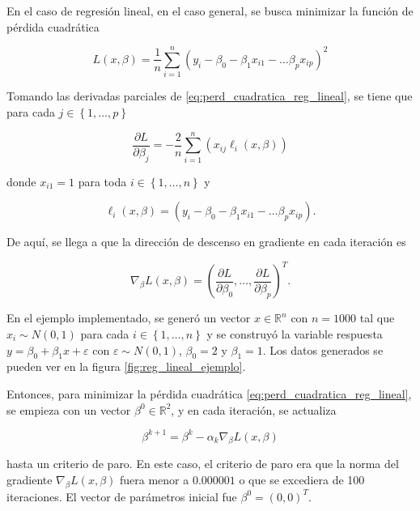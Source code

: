 En el caso de regresión lineal, en el caso general, se busca minimizar la función de pérdida cuadrática

\begin{equation}
  \label{eq:perd_cuadratica_reg_lineal}
  L(x, \beta) = \frac{1}{n} \sum_{i = 1}^n \left( y_i - \beta_0 - \beta_1 x_{i1} - \hdots  \beta_p x_{ip} \right)^2
\end{equation}

Tomando las derivadas parciales de \ref{eq:perd_cuadratica_reg_lineal}, se tiene que para cada $j \in \left\{1, \hdots, p \right\}$

\begin{equation}
  \frac{\partial L}{\partial \beta_j} = 
    -\frac{2}{n} \sum_{i = 1}^n \left( x_{ij} \ell_i(x, \beta) \right)
\end{equation}

donde $x_{i1} = 1$ para toda $i \in \left\{1, \hdots, n \right\}$ y

\begin{equation}
  \label{eq:ele_i_reg_lineal}
  \ell_i(x, \beta) = \left( y_i - \beta_0 - \beta_1 x_{i1} - \hdots  \beta_p x_{ip} \right).
\end{equation}

De aquí, se llega a que la dirección de descenso en gradiente en cada iteración es

$$
  \nabla_{\beta} L(x, \beta) = \left( \frac{\partial L}{\partial \beta_0}, \hdots, \frac{\partial L}{\partial \beta_p} \right)^T.
$$

En el ejemplo implementado, se generó un vector $x \in \mathbb{R}^n$ con $n = 1000$ tal que $x_i \sim N(0, 1)$ para cada $i \in \left\{1, \hdots, n \right\}$ y se construyó la variable respuesta $y = \beta_0 + \beta_1x + \varepsilon$ con $\varepsilon \sim N(0, 1)$, $\beta_0 = 2$ y $\beta_1 = 1$. Los datos generados se pueden ver en la figura \ref{fig:reg_lineal_ejemplo}.

Entonces, para minimizar la pérdida cuadrática \ref{eq:perd_cuadratica_reg_lineal}, se empieza con un vector $\beta^0 \in \mathbb{R}^2$, y en cada iteración, se actualiza 

$$
  \beta^{k+1} = \beta^k - \alpha_k \nabla_{\beta} L(x, \beta)
$$

hasta un criterio de paro. En este caso, el criterio de paro era que la norma del gradiente $\nabla_{\beta} L(x, \beta)$ fuera menor a $0.000001$ o que se excediera de 100 iteraciones. El vector de parámetros inicial fue $\beta^0 = (0, 0)^T$. 

